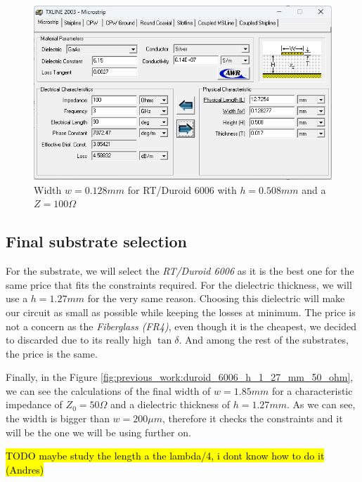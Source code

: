 \documentclass[12pt]{report} %
\newcommand{\todo}[1]{\sethlcolor{green}\hl{TODO #1}}
\begin{document}
\begin{figure}[htbp]
    \centering
    \includegraphics[width=\textwidth]{images/previous_work/txline_tool_duroid_6006_h_0_508_mm_100_ohm.png}
    \caption{Width $w = 0.128 mm$ for RT/Duroid 6006 with $h = 0.508 mm$ and a $Z = 100 \Omega$}
    \label{fig:previous_work:duroid_6006_h_0_508_mm_100_ohm}
\end{figure}

\subsection{Final substrate selection}

For the substrate, we will select the \textit{RT/Duroid 6006} as it is the best one for the same price that fits the constraints required. For the dielectric thickness, we will use a $h = 1.27 mm$ for the very same reason. Choosing this dielectric will make our circuit as small as possible while keeping the losses at minimum. The price is not a concern as the \textit{Fiberglass (FR4)}, even though it is the cheapest, we decided to discarded due to its really high $\tan \delta$. And among the rest of the substrates, the price is the same.

Finally, in the Figure \ref{fig:previous_work:duroid_6006_h_1_27_mm_50_ohm}, we can see the calculations of the final width of $w = 1.85 mm$ for a characteristic impedance of $Z_{0} = 50 \Omega$ and a dielectric thickness of $h = 1.27 mm$. As we can see, the width is bigger than $w = 200 \mu m$, therefore it checks the constraints and it will be the one we will be using further on.

\todo{maybe study the length a the lambda/4, i dont know how to do it (Andres)}
\end{document}
